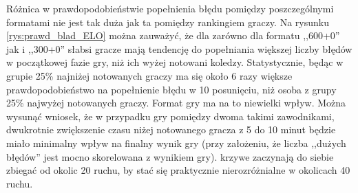 \documentclass[inzynierska]{pwr_wmat_praca_dyplomowa}
\theoremstyle{plain}
\numberwithin{theorem}{chapter}
\theoremstyle{definition}
\numberwithin{theorem}{chapter}
\begin{document}
Różnica w prawdopodobieństwie popełnienia błędu pomiędzy poszczególnymi formatami nie jest tak duża jak ta pomiędzy rankingiem graczy. Na rysunku \ref{rys:prawd_blad_ELO} można zauważyć, że dla zarówno dla formatu ,,600+0'' jak i ,,300+0'' słabsi gracze mają tendencję do popełniania większej liczby błędów w początkowej fazie gry, niż ich wyżej notowani koledzy. Statystycznie, będąc w grupie 25\% najniżej notowanych graczy ma się około 6 razy większe prawdopodobieństwo na popełnienie błędu w 10 posunięciu, niż osoba z grupy 25\% najwyżej notowanych graczy. Format gry ma na to niewielki wpływ. Można wysunąć wniosek, że w przypadku gry pomiędzy dwoma takimi zawodnikami, dwukrotnie zwiększenie czasu niżej notowanego gracza z 5 do 10 minut będzie miało minimalny wpływ na finalny wynik gry (przy założeniu, że liczba ,,dużych błędów'' jest mocno skorelowana z wynikiem gry). krzywe zaczynają do siebie zbiegać od okolic 20 ruchu, by stać się praktycznie nierozróżnialne w okolicach 40 ruchu.
\end{document}
